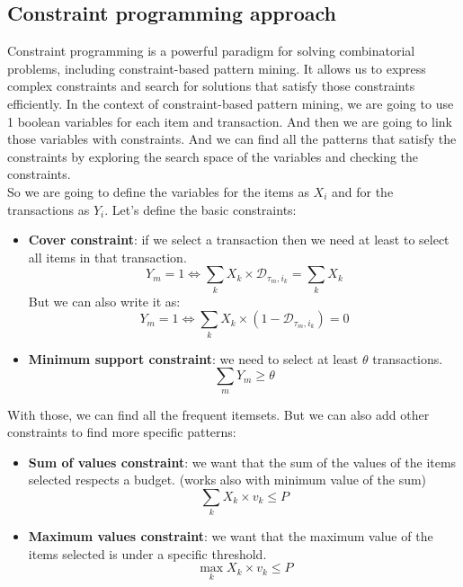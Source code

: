 \documentclass[12pt, openany]{report}
\theoremstyle{definition}
\begin{document}
\subsection{Constraint programming approach}
Constraint programming is a powerful paradigm for solving combinatorial problems, including constraint-based pattern mining. It allows us to express complex constraints and search for solutions that satisfy those constraints efficiently. In the context of constraint-based pattern mining, we are going to use 1 boolean variables for each item and transaction. And then we are going to link those variables with constraints. And we can find all the patterns that satisfy the constraints by exploring the search space of the variables and checking the constraints.\\
So we are going to define the variables for the items as $X_i$ and for the transactions as $Y_i$. Let's define the basic constraints:
\begin{itemize}
    \item \textbf{Cover constraint}: if we select a transaction then we need at least to select all items in that transaction. 
    \begin{equation}
        Y_m = 1 \Leftrightarrow \sum_k X_k \times \mathcal{D}_{\tau_m,i_k} = \sum_k X_k
    \end{equation}
    But we can also write it as:
    \begin{equation}        
        Y_m = 1 \Leftrightarrow \sum_k X_k \times (1-\mathcal{D}_{\tau_m,i_k}) = 0
    \end{equation}
    \item \textbf{Minimum support constraint}: we need to select at least $\theta$ transactions.
    \begin{equation}
        \sum_m Y_m \geq \theta
    \end{equation}
\end{itemize}
With those, we can find all the frequent itemsets. But we can also add other constraints to find more specific patterns:
\begin{itemize}
    \item \textbf{Sum of values constraint}: we want that the sum of the values of the items  selected respects a budget. (works also with minimum value of the sum)
    \begin{equation}
        \sum_k X_k \times v_k \leq P
    \end{equation}
    \item \textbf{Maximum values constraint}: we want that the maximum value of the items selected is under a specific threshold.
    \begin{equation}
        \max_k X_k \times v_k \leq P
    \end{equation}
\end{itemize}
\end{document}
